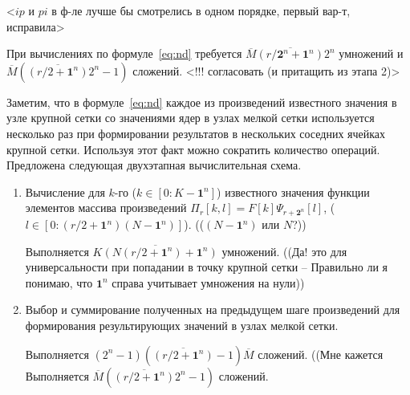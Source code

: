 <$ip$ и $pi$ в ф-ле лучше бы смотрелись в одном порядке, первый вар-т, исправила>

При вычислениях по формуле~\eqref{eq:nd} требуется
$\overline{M}\overline{(r/\mathbf{2}^n+\mathbf{1}^n)} 2^n$
умножений и
$\overline{M}(\overline{(r/2+\mathbf{1}^n)}2^n -1)$
сложений. <!!! согласовать (и притащить из этапа 2)> 


  

Заметим, 
что в формуле~\eqref{eq:nd} каждое из произведений известного значения в узле крупной сетки
со значениями ядер в узлах мелкой сетки используется несколько раз
при формировании результатов в нескольких соседних
ячейках 
крупной сетки.
Используя этот факт можно сократить количество операций. %
Предложена следующая двухэтапная вычислительная схема.
\begin{enumerate}
\item
  Вычисление для $k$-го ($k \in [0:K-\mathbf{1}^n]$)
  известного значения функции 
  элементов массива произведений
  $\Pi_r[k,l] = F[k]\Psi_{r+\mathbf{2}^n}[l]$,
($l \in [0:(r/2+\mathbf{1}^n)(N-\mathbf{1}^n)]$). (($(N-\mathbf{1}^n) $ или $N $?))

  Выполняется $\overline{K (N(r/2 + \mathbf{1}^n) +\mathbf{1}^n)}$ умножений.
  ((Да! это для универсальности при попадании в точку крупной сетки
  -- Правильно ли я понимаю, что $\mathbf{1}^n$ справа учитывает умножения на нули))
\item
  Выбор и суммирование полученных на предыдущем шаге произведений
  для формирования результирующих значений в узлах мелкой сетки.
  

  Выполняется $(2^n-1)  (\overline{(r/2+\mathbf{1}^n)} -1)  \overline{M}$ сложений.
  ((Мне кажется Выполняется $\overline{M}  (\overline{(r/2+\mathbf{1}^n)}2^n -1)  $ сложений.

\end{enumerate}

